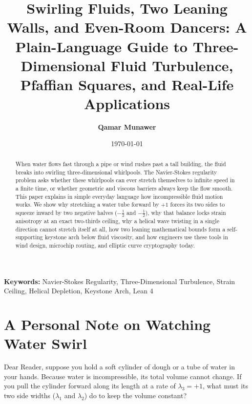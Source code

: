 \documentclass[11pt,a4paper]{article}
\title{\textbf{Swirling Fluids, Two Leaning Walls, and Even-Room Dancers: A Plain-Language Guide to Three-Dimensional Fluid Turbulence, Pfaffian Squares, and Real-Life Applications}}
\author{\textbf{Qamar Munawer}}
\date{\today}
\theoremstyle{definition}
\begin{document}
\maketitle

\begin{abstract}
When water flows fast through a pipe or wind rushes past a tall building, the fluid breaks into swirling three-dimensional whirlpools. The Navier-Stokes regularity problem asks whether these whirlpools can ever stretch themselves to infinite speed in a finite time, or whether geometric and viscous barriers always keep the flow smooth. This paper explains in simple everyday language how incompressible fluid motion works. We show why stretching a water tube forward by $+1$ forces its two sides to squeeze inward by two negative halves ($-\frac{1}{2}$ and $-\frac{1}{2}$), why that balance locks strain anisotropy at an exact two-thirds ceiling, why a helical wave twisting in a single direction cannot stretch itself at all, how two leaning mathematical bounds form a self-supporting keystone arch below fluid viscosity, and how engineers use these tools in wind design, microchip routing, and elliptic curve cryptography today.
\end{abstract}

\vspace{1em}
\noindent\textbf{Keywords:} Navier-Stokes Regularity, Three-Dimensional Turbulence, Strain Ceiling, Helical Depletion, Keystone Arch, Lean 4

\section{A Personal Note on Watching Water Swirl}
Dear Reader, suppose you hold a soft cylinder of dough or a tube of water in your hands. Because water is incompressible, its total volume cannot change. If you pull the cylinder forward along its length at a rate of $\lambda_3 = +1$, what must its two side widths ($\lambda_1$ and $\lambda_2$) do to keep the volume constant?
\end{document}
